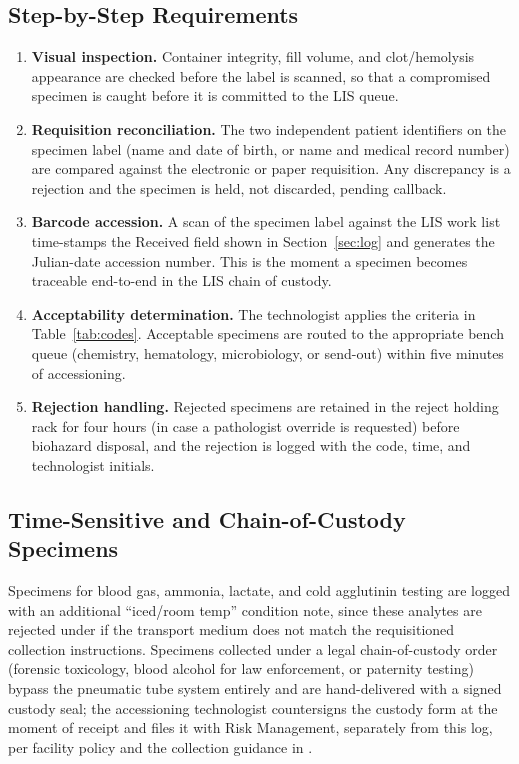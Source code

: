 \subsection{Step-by-Step Requirements}
\begin{enumerate}
  \item \textbf{Visual inspection.} Container integrity, fill volume, and clot/hemolysis
    appearance are checked before the label is scanned, so that a compromised specimen is
    caught before it is committed to the LIS queue.
  \item \textbf{Requisition reconciliation.} The two independent patient identifiers on the
    specimen label (name and date of birth, or name and medical record number) are compared
    against the electronic or paper requisition. Any discrepancy is a  rejection
    and the specimen is held, not discarded, pending callback.
  \item \textbf{Barcode accession.} A scan of the specimen label against the LIS work list
    time-stamps the Received field shown in Section~\ref{sec:log} and generates the
    Julian-date accession number. This is the moment a specimen becomes traceable end-to-end
    in the LIS chain of custody.
  \item \textbf{Acceptability determination.} The technologist applies the criteria in
    Table~\ref{tab:codes}. Acceptable specimens are routed to the appropriate bench queue
    (chemistry, hematology, microbiology, or send-out) within five minutes of accessioning.
  \item \textbf{Rejection handling.} Rejected specimens are retained in the reject holding
    rack for four hours (in case a pathologist override is requested) before biohazard
    disposal, and the rejection is logged with the code, time, and technologist initials.
\end{enumerate}

\subsection{Time-Sensitive and Chain-of-Custody Specimens}
Specimens for blood gas, ammonia, lactate, and cold agglutinin testing are logged with an
additional ``iced/room temp'' condition note, since these analytes are rejected under
 if the transport medium does not match the requisitioned collection instructions.
Specimens collected under a legal chain-of-custody order (forensic toxicology, blood alcohol
for law enforcement, or paternity testing) bypass the pneumatic tube system entirely and are
hand-delivered with a signed custody seal; the accessioning technologist countersigns the
custody form at the moment of receipt and files it with Risk Management, separately from this
log, per facility policy and the collection guidance in \citet{clsi_gp41}.
